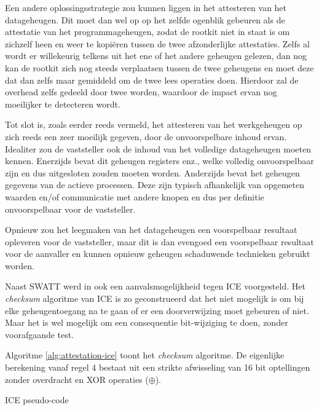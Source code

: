 Een andere oplossingsstrategie zou kunnen liggen in het attesteren van het datageheugen. Dit moet dan wel op op het zelfde ogenblik gebeuren als de attestatie
van het programmageheugen, zodat de rootkit niet in staat is om zichzelf heen
en weer te kopi\"eren tussen de twee afzonderlijke attestaties. Zelfs al wordt
er willekeurig telkens uit het ene of het andere geheugen gelezen, dan nog kan
de rootkit zich nog steeds verplaatsen tussen de twee geheugens en moet deze
dat dan zelfs maar gemiddeld om de twee lees operaties doen. Hierdoor zal de
overhead zelfs gedeeld door twee worden, waardoor de impact ervan nog
moeilijker te detecteren wordt.

Tot slot is, zoals eerder reeds vermeld, het attesteren van het werkgeheugen op
zich reeds een zeer moeilijk gegeven, door de onvoorspelbare inhoud ervan.
Idealiter zou de vaststeller ook de inhoud van het volledige datageheugen
moeten kennen. Enerzijds bevat dit geheugen registers enz., welke volledig
onvoorspelbaar zijn en dus uitgesloten zouden moeten worden. Anderzijds bevat
het geheugen gegevens van de actieve processen. Deze zijn typisch afhankelijk
van opgemeten waarden en/of communicatie met andere knopen en dus per definitie
onvoorspelbaar voor de vaststeller.

Opnieuw zou het leegmaken van het datageheugen een voorspelbaar resultaat
opleveren voor de vaststeller, maar dit is dan evengoed een voorspelbaar
resultaat voor de aanvaller en kunnen opnieuw geheugen schaduwende technieken
gebruikt worden.

Naast SWATT werd in \citep{castelluccia2009difficulty} ook een
aanvalsmogelijkheid tegen ICE voorgesteld. Het \emph{checksum} algoritme van
ICE is zo geconstrueerd dat het niet mogelijk is om bij elke geheugentoegang na
te gaan of er een doorverwijzing moet gebeuren of niet. Maar het is wel
mogelijk om een consequentie bit-wijziging te doen, zonder voorafgaande test.

Algoritme \ref{alg:attestation-ice} toont het \emph{checksum} algoritme. De
eigenlijke berekening vanaf regel 4 bestaat uit een strikte afwisseling van
16 bit optellingen zonder overdracht en XOR operaties ($\oplus$).

\begin{algorithm}
\begin{algorithmic}[1]
     
     
       
      
        
  \EndFor
\end{algorithmic}
\caption{ICE pseudo-code\label{alg:attestation-ice}}
\end{algorithm}


